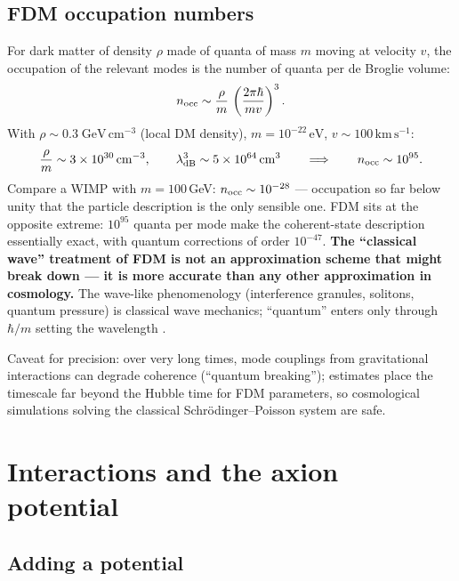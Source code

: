 \documentclass[12pt]{article}
\newcommand{\eV}{\,\mathrm{eV}}
\newcommand{\kms}{\,\mathrm{km\,s^{-1}}}
\begin{document}
\subsection{FDM occupation numbers}
\label{sec:occupation}

For dark matter of density $\rho$ made of quanta of mass $m$ moving
at velocity $v$, the occupation of the relevant modes is the number
of quanta per de Broglie volume:
%
\begin{equation}
  n_{\rm occ} \sim \frac{\rho}{m}\,
      \left(\frac{2\pi\hbar}{m v}\right)^{3}.
\end{equation}
%
With $\rho \sim 0.3\;\mathrm{GeV\,cm^{-3}}$ (local DM density),
$m = 10^{-22}\eV$, $v \sim 100\kms$:
%
\begin{equation}
  \frac{\rho}{m} \sim 3\times10^{30}\,\mathrm{cm^{-3}},
  \qquad
  \lambda_{\rm dB}^3 \sim 5\times10^{64}\,\mathrm{cm^{3}}
  \qquad\Longrightarrow\qquad
  n_{\rm occ} \sim 10^{95}.
\end{equation}
%
Compare a WIMP with $m = 100\,$GeV: $n_{\rm occ} \sim 10^{-28}$ ---
occupation so far below unity that the particle description is the
only sensible one.  FDM sits at the opposite extreme: $10^{95}$
quanta per mode make the coherent-state description essentially
exact, with quantum corrections of order $10^{-47}$.  \textbf{The
``classical wave'' treatment of FDM is not an approximation scheme
that might break down --- it is more accurate than any other
approximation in cosmology.}  The wave-like phenomenology
(interference granules, solitons, quantum pressure) is classical
wave mechanics; ``quantum'' enters only through $\hbar/m$ setting
the wavelength \citep{Hui2017}.

Caveat for precision: over very long times, mode couplings from
gravitational interactions can degrade coherence (``quantum
breaking''); estimates place the timescale far beyond the Hubble time
for FDM parameters, so cosmological simulations solving the
classical Schr\"odinger--Poisson system are safe.

\section{Interactions and the axion potential}
\label{sec:interactions}

\subsection{Adding a potential}
\label{sec:potential}
\end{document}
